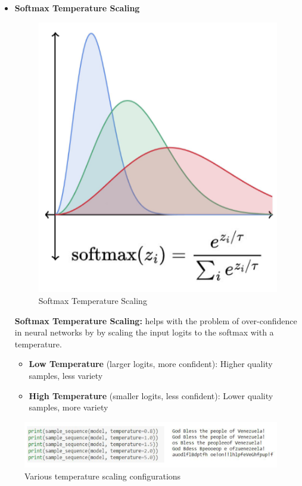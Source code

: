 \begin{itemize}
\begin{definition}
\end{definition}

    \item \textbf{Softmax Temperature Scaling}

\begin{figure}[h!t]
    \centering
    \includegraphics[width=0.4\linewidth]{softmaxtempscaling.png}
    \caption{Softmax Temperature Scaling}
    \label{fig:enter-label}
\end{figure}

\begin{definition}
    \textbf{Softmax Temperature Scaling:}  helps with the problem of over-confidence in neural
networks by by scaling the input logits to the softmax with a temperature.
\end{definition}

    \begin{itemize}
        \item \textbf{Low Temperature} (larger logits, more confident): Higher quality samples, less variety
        \item \textbf{High Temperature} (smaller logits, less confident): Lower quality samples, more variety
    \end{itemize}
\end{itemize}

\begin{figure}[h!t]
    \centering
    \includegraphics[width=1\linewidth]{tempscaling.png}
    \caption{Various temperature scaling configurations}
    \label{fig:enter-label}
\end{figure}

